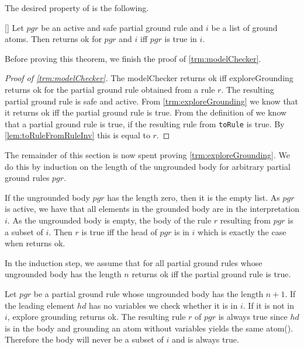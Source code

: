     The desired property of \exploreGrounding is the following.

    \begin{theorem}\label{trm:exploreGrounding}[\exploreGroundingSemantics]
        Let $pgr$ be an active and safe partial ground rule and $i$ be a list of ground atoms. Then \exploreGrounding returns ok for $pgr$ and $i$ iff $pgr$ is true in $i$.
    \end{theorem}

    Before proving this theorem, we finish the proof of \cref{trm:modelChecker}.

    \begin{proof}[Proof of \cref{trm:modelChecker}]
        The modelChecker returns ok iff exploreGrounding returns ok for the partial ground rule obtained from a rule $r$. The resulting partial ground rule is safe and active. From \cref{trm:exploreGrounding} we know that it returns ok iff the partial ground rule is true. From the definition of \partialGroundRuleisTrue we know that a partial ground rule is true, if the resulting rule from \lstinline|toRule| is true. By \cref{lem:toRuleFromRuleInv} this is equal to $r$.
    \end{proof}

    The remainder of this section is now spent proving \cref{trm:exploreGrounding}. We do this by induction on the length of the ungrounded body for arbitrary partial ground rules $pgr$.

    If the ungrounded body $pgr$ has the length zero, then it is the empty list. As $pgr$ is active, we have that all elements in the grounded body are in the interpretation $i$. As the ungrounded body is empty, the body of the rule $r$ resulting from $pgr$ is a subset of $i$. Then $r$ is true iff the head of $pgr$ is in $i$ which is exactly the case when \exploreGrounding returns ok.

    In the induction step, we assume that for all partial ground rules whose ungrounded body has the length $n$ \exploreGrounding returns ok iff the partial ground rule is true.

    Let $pgr$ be a partial ground rule whose ungrounded body has the length $n+1$. If the leading element $hd$ has no variables we check whether it is in $i$. If it is not in $i$, explore grounding returns ok. The resulting rule $r$ of $pgr$ is always true since $hd$ is in the body and grounding an atom without variables yields the same atom(\groundingAtomWithoutVariablesYieldsSelf). Therefore the body will never be a subset of $i$ and is always true.

